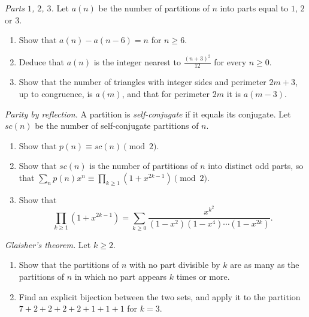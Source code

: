 \begin{exercise}[$\star\star$]\label{pb:parts123}
\emph{Parts $1$, $2$, $3$.} Let $a(n)$ be the number of partitions of $n$ into parts equal to $1$, $2$ or $3$.
\begin{enumerate}[label=(\alph*)]
\item Show that $a(n)-a(n-6)=n$ for $n\ge6$.
\item Deduce that $a(n)$ is the integer nearest to $\frac{(n+3)^2}{12}$ for every $n\ge0$.
\item Show that the number of triangles with integer sides and perimeter $2m+3$, up to congruence, is $a(m)$, and that for
perimeter $2m$ it is $a(m-3)$.
\end{enumerate}
\end{exercise}

\begin{exercise}[$\star$]\label{pb:selfconj}
\emph{Parity by reflection.} A partition is \emph{self-conjugate} if it equals its conjugate. Let $sc(n)$ be the number of
self-conjugate partitions of $n$.
\begin{enumerate}[label=(\alph*)]
\item Show that $p(n)\equiv sc(n)\pmod2$.
\item Show that $sc(n)$ is the number of partitions of $n$ into distinct odd parts, so that
$\sum_np(n)x^n\equiv\prod_{k\ge1}(1+x^{2k-1})\pmod2$.
\item Show that
\[
\prod_{k\ge1}(1+x^{2k-1})=\sum_{k\ge0}\frac{x^{k^2}}{(1-x^2)(1-x^4)\cdots(1-x^{2k})}.
\]
\end{enumerate}
\end{exercise}

\begin{exercise}[$\star\star$]\label{pb:glaisherthm}
\emph{Glaisher's theorem.} Let $k\ge2$.
\begin{enumerate}[label=(\alph*)]
\item Show that the partitions of $n$ with no part divisible by $k$ are as many as the partitions of $n$ in which no part
appears $k$ times or more.
\item Find an explicit bijection between the two sets, and apply it to the partition $7+2+2+2+2+1+1+1$ for $k=3$.
\end{enumerate}
\end{exercise}

